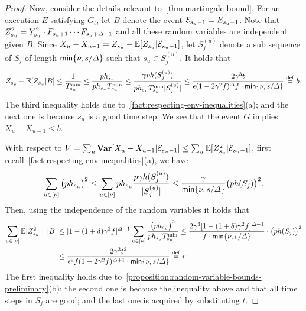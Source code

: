 \begin{proof}
    Now, consider the details relevant to~\cref{thm:martingale-bound}.
    For an execution $E$ satisfying $G_t$, let $B$ denote the event $\mathcal{E}_{s_u - 1} = E_{s_u - 1}$.
    Note that $Z^2_{s_u} = Y^2_{s_u} \cdot F_{s_u + 1} \cdots F_{s_u + \varDelta - 1}$ and all these random variables are independent given $B$.
    Since $X_u - X_{u - 1} = Z_{s_u} - \mathbb{E} [Z_{s_u} |\mathcal{E}_{s_u - 1}]$, let $S^{(u)}_j$ denote a sub sequence of $S_j$ of length $\mathsf{min} \{ \nu, s / \varDelta \}$ such that $s_u \in S^{(u)}_j$.
    It holds that
    \begin{equation} \label{eq:b-def-qs-lb}
        Z_{s_u} - \mathbb{E} [Z_{s_u} |B] \le \frac{1}{T^{\mathrm{min}}_{s_u}} \le \frac{p h_{s_u}}{{ph_{s_u}} T^{\mathrm{min}}_{s_u}} \le \frac{\gamma p h(S^{(u)}_j)}{{ph_{s_u}} T^{\mathrm{min}}_{s_u} |S^{(u)}_j|} \le \frac{2\gamma^3 t}{\epsilon (1 - 2\gamma^2 f)^\varDelta f \cdot \mathsf{min}\{ \nu, s / \varDelta \}} \overset{\mathrm{def}}{=} b.
    \end{equation}
    The third inequality holds due to~\cref{fact:respecting-env-inequalities}(a); and the next one is because $s_u$ is a good time step.
    We see that the event $G$ implies $X_u - X_{u - 1} \le b$.

    With respect to $V = \sum_u \mathbf{Var} [X_u - X_{u - 1} | \mathcal{E}_{s_u - 1}] \le \sum_u \mathbb{E} [Z^2_{s_u} | \mathcal{E}_{s_u - 1}]$, first recall~\cref{fact:respecting-env-inequalities}(a), we have
    \[ \sum_{u \in [\nu]} \big( p h_{s_u} \big)^2 \le \sum_{u \in [\nu]} p h_{s_u} \frac{p \gamma h(S^{(u)}_j)}{|S^{(u)}_j|} \le \frac{\gamma}{\mathsf{min} \{ \nu, s / \varDelta \}} \big( p h(S_j) \big)^2. \]
    Then, using the independence of the random variables it holds that
    \begin{align}
        \sum_{u \in [\nu]} \mathbb{E} [Z^2_{s_u - 1} | B]
         & \le
        [1 - (1 + \delta) \gamma^2 f]^{\varDelta - 1} \sum_{u \in [\nu]} \frac{ \big( p h_{s_u} \big)^2}{p h_{s_u} T^{\mathrm{min}}_{s_u}}
        \le
        \frac{2\gamma^3 [1 - (1 + \delta) \gamma^2 f]^{\varDelta - 1}}{f \cdot \mathsf{min} \{ \nu, s / \varDelta \}} \cdot \big( p h(S_j) \big)^2
        \nonumber \\
        \label{eq:v-def-qs-lb}
         & \le
        \frac{2 \gamma^3 t^2}{\epsilon^2 f (1 - 2\gamma^2 f)^{\varDelta + 1} \cdot \mathsf{min}\{ \nu, s / \varDelta \}} \overset{\mathrm{def}}{=} v.
    \end{align}
    The first inequality holds due to~\cref{proposition:random-variable-bounds-preliminary}(b); the second one is because the inequality above and that all time steps in $S_j$ are good; and the last one is acquired by substituting $t$.


\end{proof}

